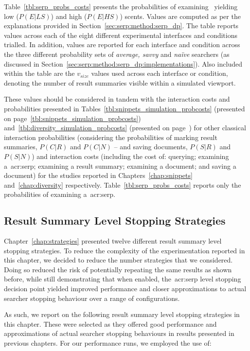 Table~\ref{tbl:serp_probs_costs} presents the probabilities of examining~ yielding low ($P(E|LS)$) and high ($P(E|HS)$) scents. Values are computed as per the explanations provided in Section~\ref{sec:serp:method:serp_dp}. The table reports values across each of the eight different experimental interfaces and conditions trialled. In addition, values are reported for each interface and condition across the three different probability sets of \emph{average, savvy} and \emph{na\"{i}ve} searchers (as discussed in Section~\ref{sec:serp:method:serp_dp:implementations}). Also included within the table are the $v_{size}$ values used across each interface or condition, denoting the number of result summaries visible within a simulated viewport.

These values should be considered in tandem with the interaction costs and probabilities presented in Tables~\ref{tbl:snippets_simulation_probcosts} (presented on page~\ref{tbl:snippets_simulation_probcosts}) and~\ref{tbl:diversity_simulation_probcosts} (presented on page~\pageref{tbl:diversity_simulation_probcosts}) for other classical interaction probabilities (considering the probabilities of marking result summaries, $P(C|R)$ and $P(C|N)$ -- and saving documents, $P(S|R)$ and $P(S|N)$) and interaction costs (including the cost of: querying; examining a~\gls{acr:serp}; examining a result summary; examining a document; and saving a document) for the studies reported in Chapters~\ref{chap:snippets} and~\ref{chap:diversity} respectively. Table~\ref{tbl:serp_probs_costs} reports only the probabilities of examining a~\gls{acr:serp}.

\subsection{Result Summary Level Stopping Strategies}\label{sec:serp:method:snippet}
Chapter~\ref{chap:strategies} presented twelve different result summary level stopping strategies. To reduce the complexity of the experimentation reported in this chapter, we decided to reduce the number strategies that we considered. Doing so reduced the risk of potentially repeating the same results as shown before, while still demonstrating that when enabled, the~\gls{acr:serp} level stopping decision point yielded improved performance and closer approximations to actual searcher stopping behaviour over a range of configurations.

As such, we report on the following result summary level stopping strategies in this chapter. These were selected as they offered good performance and approximations of actual searcher stopping behaviours in results presented in previous chapters. For our performance runs, we employed the use of:


